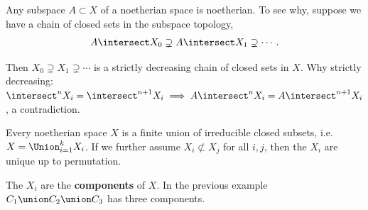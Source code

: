 \begin{remark}

Any subspace \(A\subset X\) of a noetherian space is noetherian. To see
why, suppose we have a chain of closed sets in the subspace topology,
\begin{align*}  
A\intersect X_0 \supsetneq A\intersect X_1 \supsetneq \cdots
.\end{align*}

Then \(X_0 \supsetneq X_1 \supsetneq \cdots\) is a strictly decreasing
chain of closed sets in \(X\). Why strictly decreasing:
\(\intersect^n X_i = \intersect^{n+1} X_i \implies A\intersect^n X_i = A\intersect^{n+1} X_i\),
a contradiction.

\end{remark}

\begin{proposition}[Important]

Every noetherian space \(X\) is a finite union of irreducible closed
subsets, i.e.~\(X = \Union_{i=1}^k X_i\). If we further assume
\(X_i \not\subset X_j\) for all \(i, j\), then the \(X_i\) are unique up
to permutation.

\end{proposition}

\begin{remark}

The \(X_i\) are the \textbf{components} of \(X\). In the previous
example \(C_1 \union C_2 \union C_3\) has three components.

\end{remark}


